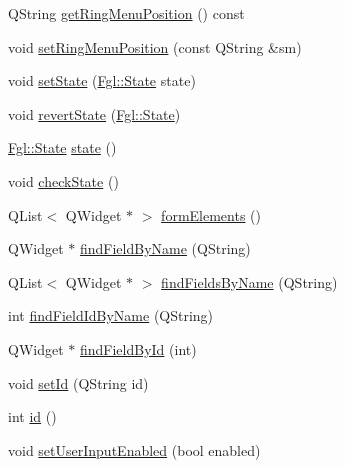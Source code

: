 \begin{DoxyCompactItemize}
QString \hyperlink{classFglForm_a773cd80cab1ae1efaccc48262b2cbc55}{getRingMenuPosition} () const 
\item 
void \hyperlink{classFglForm_af25c944e246c0522cd333e452ead9cad}{setRingMenuPosition} (const QString \&sm)
\item 
void \hyperlink{classFglForm_a5f6285fdf157e863c68402ec8147c53a}{setState} (\hyperlink{namespaceFgl_a66700792cb225549384ae76c1057cf22}{Fgl::State} state)
\item 
void \hyperlink{classFglForm_a4d2edce15aac96b22d221a11c0e7681e}{revertState} (\hyperlink{namespaceFgl_a66700792cb225549384ae76c1057cf22}{Fgl::State})
\item 
\hyperlink{namespaceFgl_a66700792cb225549384ae76c1057cf22}{Fgl::State} \hyperlink{classFglForm_aeed42adf5a051006db1742e2b48617e1}{state} ()
\item 
void \hyperlink{classFglForm_a0ef6e6d0ddf327e89c3e2d54be8548a6}{checkState} ()
\item 
QList$<$ QWidget $\ast$ $>$ \hyperlink{classFglForm_ab40c533416d35aac75f2ccf5157a3cf2}{formElements} ()
\item 
QWidget $\ast$ \hyperlink{classFglForm_a7490b2d18830368110a69983f19d65cf}{findFieldByName} (QString)
\item 
QList$<$ QWidget $\ast$ $>$ \hyperlink{classFglForm_aa9bed6529e8937fdf1ebed65ca23cc45}{findFieldsByName} (QString)
\item 
int \hyperlink{classFglForm_a4d506d1f05b8ac540fe33dfa1524d681}{findFieldIdByName} (QString)
\item 
QWidget $\ast$ \hyperlink{classFglForm_a997cd55b341e14c89fdc300efe75b907}{findFieldById} (int)
\item 
void \hyperlink{classFglForm_a7010467be800cf868884b589f8ce8ce7}{setId} (QString id)
\item 
int \hyperlink{classFglForm_a4fc9bc745910f209c6f54f509293bd73}{id} ()
\item 
void \hyperlink{classFglForm_a47d0bbf071cbf0051b72c44a90062f81}{setUserInputEnabled} (bool enabled)
\end{DoxyCompactItemize}
